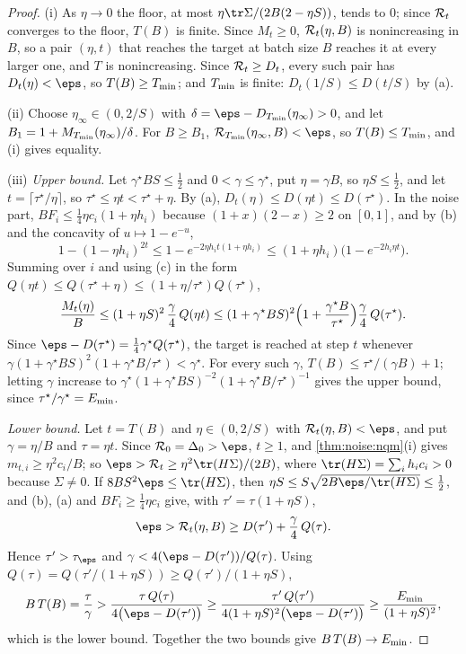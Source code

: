 \begin{refsection}
\begin{proof}
(i) As $\eta\to0$ the floor, at most $\eta\tr\Sigma/(2B(2-\eta S))$, tends to $0$; since $\mathcal{R}_t$ converges to the floor, $T(B)$ is finite. Since $M_t\ge0$, $\mathcal{R}_t(\eta,B)$ is nonincreasing in $B$, so a pair $(\eta,t)$ that reaches the target at batch size $B$ reaches it at every larger one, and $T$ is nonincreasing. Since $\mathcal{R}_t\ge D_t$, every such pair has $D_t(\eta)<\eps$, so $T(B)\ge T_{\min}$; and $T_{\min}$ is finite: $D_t(1/S)\le D(t/S)$ by (a).

(ii) Choose $\eta_\infty\in(0,2/S)$ with $\delta=\eps-D_{\noiseTmin}(\eta_\infty)>0$, and let $B_1=1+M_{T_{\min}}(\eta_\infty)/\delta$. For $B\ge B_1$, $\cR_{\noiseTmin}(\eta_\infty,B)<\eps$, so $T(B)\le T_{\min}$, and (i) gives equality.

(iii) \emph{Upper bound.} Let $\gamma^\star BS\le\frac12$ and $0<\gamma\le\gamma^\star$, put $\eta=\gamma B$, so $\eta S\le\frac12$, and let $t=\lceil\tau^\star/\eta\rceil$, so $\tau^\star\le\eta t<\tau^\star+\eta$. By (a), $D_t(\eta)\le D(\eta t)\le D(\tau^\star)$. In the noise part, $BF_i\le\frac14\eta c_i(1+\eta h_i)$ because $(1+x)(2-x)\ge2$ on $[0,1]$, and by (b) and the concavity of $u\mapsto1-e^{-u}$,
\[
  1-(1-\eta h_i)^{2t}\le1-e^{-2\eta h_it(1+\eta h_i)}\le(1+\eta h_i)\bigl(1-e^{-2h_i\eta t}\bigr).
\]
Summing over $i$ and using (c) in the form $Q(\eta t)\le Q(\tau^\star+\eta)\le(1+\eta/\tau^\star)Q(\tau^\star)$,
\[
  \frac{M_t(\eta)}B\le(1+\eta S)^2\,\frac\gamma4\,Q(\eta t)\le(1+\gamma^\star BS)^2\Bigl(1+\frac{\gamma^\star B}{\tau^\star}\Bigr)\frac\gamma4\,Q(\tau^\star).
\]
Since $\eps-D(\tau^\star)=\frac14\gamma^\star Q(\tau^\star)$, the target is reached at step $t$ whenever $\gamma(1+\gamma^\star BS)^2(1+\gamma^\star B/\tau^\star)<\gamma^\star$. For every such $\gamma$, $T(B)\le\tau^\star/(\gamma B)+1$; letting $\gamma$ increase to $\gamma^\star(1+\gamma^\star BS)^{-2}(1+\gamma^\star B/\tau^\star)^{-1}$ gives the upper bound, since $\tau^\star/\gamma^\star=E_{\min}$.

\emph{Lower bound.} Let $t=T(B)$ and $\eta\in(0,2/S)$ with $\cR_t(\eta,B)<\eps$, and put $\gamma=\eta/B$ and $\tau=\eta t$. Since $\cR_0=\Delta_0>\eps$, $t\ge1$, and \cref{thm:noise:nqm}(i) gives $m_{t,i}\ge\eta^2c_i/B$; so $\eps>\cR_t\ge\eta^2\tr(H\Sigma)/(2B)$, where $\tr(H\Sigma)=\sum_ih_ic_i>0$ because $\Sigma\ne0$. If $8BS^2\eps\le\tr(H\Sigma)$, then $\eta S\le S\sqrt{2B\eps/\tr(H\Sigma)}\le\frac12$, and (b), (a) and $BF_i\ge\frac14\eta c_i$ give, with $\tau'=\tau(1+\eta S)$,
\[
  \eps>\cR_t(\eta,B)\ge D(\tau')+\frac\gamma4\,Q(\tau).
\]
Hence $\tau'>\tau_\eps$ and $\gamma<4(\eps-D(\tau'))/Q(\tau)$. Using $Q(\tau)=Q(\tau'/(1+\eta S))\ge Q(\tau')/(1+\eta S)$,
\begin{equation}\label{eq:noise:lower}
  B\,T(B)=\frac\tau\gamma>\frac{\tau\,Q(\tau)}{4\bigl(\eps-D(\tau')\bigr)}\ge\frac{\tau'\,Q(\tau')}{4(1+\eta S)^2\bigl(\eps-D(\tau')\bigr)}\ge\frac{\noiseEmin}{(1+\eta S)^2},
\end{equation}
which is the lower bound. Together the two bounds give $B\,T(B)\to E_{\min}$.


\end{proof}
\end{refsection}

